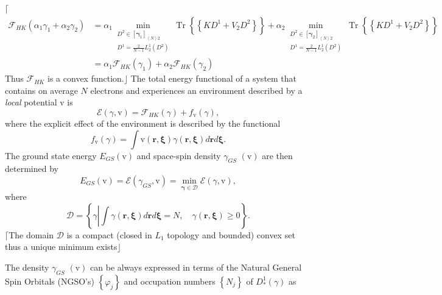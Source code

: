 \documentclass[aps,preprint]{revtex4}%
\begin{document}
$\lceil$%
\begin{align}
\mathcal{F}_{HK}\left(  \alpha_{1}\gamma_{1}+\alpha_{2}\gamma_{2}\right)   &
=\alpha_{1}\min_{\substack{D^{2}\in\left[  \mathbf{\gamma}_{1}\right]
_{\left\langle N\right\rangle 2}\\D^{1}=\frac{2}{N-1}L_{2}^{1}\left(
D^{2}\right)  }}\operatorname{Tr}\left\{  \overset{}{\left\{  KD^{1}%
+V_{2}D^{2}\right\}  }\right\}  +\alpha_{2}\min_{\substack{D^{2}\in\left[
\mathbf{\gamma}_{2}\right]  _{\left\langle N\right\rangle 2}\\D^{1}=\frac
{2}{N-1}L_{2}^{1}\left(  D^{2}\right)  }}\operatorname{Tr}\left\{  \overset
{}{\left\{  KD^{1}+V_{2}D^{2}\right\}  }\right\} \nonumber\\
&  =\alpha_{1}\mathcal{F}_{HK}\left(  \gamma_{1}\right)  +\alpha
_{2}\mathcal{F}_{HK}\left(  \gamma_{2}\right)
\end{align}
Thus $\mathcal{F}_{HK}$ is a convex function.$\rfloor$ The total energy
functional of a system that contains on average $N$ electrons and experiences
an environment described by a \emph{local} potential $\mathrm{v}$ is
\[
\mathcal{E}\left(  \gamma\mathbf{,}\mathrm{v}\right)  =\mathcal{F}_{HK}\left(
\gamma\right)  +f_{\mathrm{v}}\left(  \gamma\right)  ,
\]
where the explicit effect of the environment is described by the functional
\[
f_{\mathrm{v}}\left(  \gamma\right)  =\int\mathrm{v}\left(  \mathbf{r,\xi
}\right)  \gamma\left(  \mathbf{r,\xi}\right)  d\mathbf{r}d\mathbf{\xi.}%
\]
The ground state energy $E_{GS}\left(  \mathrm{v}\right)  $ and space-spin
density $\gamma_{GS}$ $\left(  \mathrm{v}\right)  $ are then determined by
\begin{equation}
E_{GS}\left(  \mathrm{v}\right)  =\mathcal{E}\left(  \gamma_{GS}%
\mathbf{,}\mathrm{v}\right)  =\min_{\mathbf{\gamma\in}\mathcal{D}}%
\mathcal{E}\left(  \gamma\mathbf{,}\mathrm{v}\right)  ,
\end{equation}
where
\begin{equation}
\mathcal{D=}\left\{  \gamma\left\vert \int\gamma\left(  \mathbf{r,\xi}\right)
d\mathbf{r}d\mathbf{\xi}=N,\quad\gamma\left(  \mathbf{r,\xi}\right)
\geq0\right.  \right\}  .
\end{equation}
$\lceil$The domain $\mathcal{D}$ is a compact (closed in $L_{1}$ topology and
bounded) convex set thus a unique minimum exists$\rfloor$

The density $\gamma_{GS}$ $\left(  \mathrm{v}\right)  $ can be always
expressed in terms of the Natural General Spin Orbitals (NGSO's) $\left\{
\varphi_{j}\right\}  $ and occupation numbers $\left\{  N_{j}\right\}  $ of
$D_{\ast}^{1}\left(  \gamma\right)  $ as%
\end{document}
